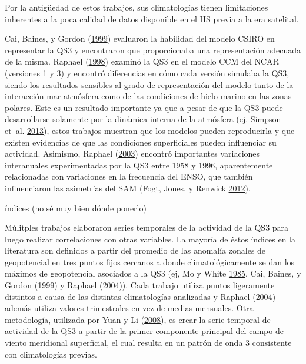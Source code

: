 \documentclass[spanish,a4paper,12p]{book}
\begin{document}
Por la antigüedad de estos trabajos, sus climatologías tienen
limitaciones inherentes a la poca calidad de datos disponible en el HS
previa a la era satelital.

Cai, Baines, y Gordon (\protect\hyperlink{ref-Cai1999}{1999}) evaluaron
la habilidad del modelo CSIRO en representar la QS3 y encontraron que
proporcionaba una representación adecuada de la misma. Raphael
(\protect\hyperlink{ref-Raphael1998}{1998}) examinó la QS3 en el modelo
CCM del NCAR (versiones 1 y 3) y encontró diferencias en cómo cada
versión simulaba la QS3, siendo los resultados sensibles al grado de
representación del modelo tanto de la interacción mar-atmósfera como de
las condiciones de hielo marino en las zonas polares. Este es un
resultado importante ya que a pesar de que la QS3 puede desarrollarse
solamente por la dinámica interna de la atmósfera (ej. Simpson et~al.
\protect\hyperlink{ref-Simpson2013}{2013}), estos trabajos muestran que
los modelos pueden reproducirla y que existen evidencias de que las
condiciones superficiales pueden influenciar su actividad. Asimismo,
Raphael (\protect\hyperlink{ref-Raphael2003}{2003}) encontró importantes
variaciones interanuales experimentadas por la QS3 entre 1958 y 1996,
aparentemente relacionadas con variaciones en la frecuencia del ENSO,
que también influenciaron las asimetrías del SAM (Fogt, Jones, y Renwick
\protect\hyperlink{ref-Fogt2012}{2012}).

índices (no sé muy bien dónde ponerlo)

Múlitples trabajos elaboraron series temporales de la actividad de la
QS3 para luego realizar correlaciones con otras variables. La mayoría de
éstos índices en la literatura son definidos a partir del promedio de
las anomalía zonales de geopotencial en tres puntos fijos cercanos a
donde climatológicamente se dan los máximos de geopotencial asociados a
la QS3 (ej, Mo y White \protect\hyperlink{ref-Mo1985}{1985}, Cai,
Baines, y Gordon (\protect\hyperlink{ref-Cai1999}{1999}) y Raphael
(\protect\hyperlink{ref-Raphael2004a}{2004})). Cada trabajo utiliza
puntos ligeramente distintos a causa de las distintas climatologías
analizadas y Raphael (\protect\hyperlink{ref-Raphael2004a}{2004}) además
utiliza valores trimestrales en vez de medias mensuales. Otra
metodología, utilizada por Yuan y Li
(\protect\hyperlink{ref-Yuan2008}{2008}), es crear la serie temporal de
actividad de la QS3 a partir de la primer componente principal del campo
de viento meridional superficial, el cual resulta en un patrón de onda 3
consistente con climatologías previas.
\end{document}
